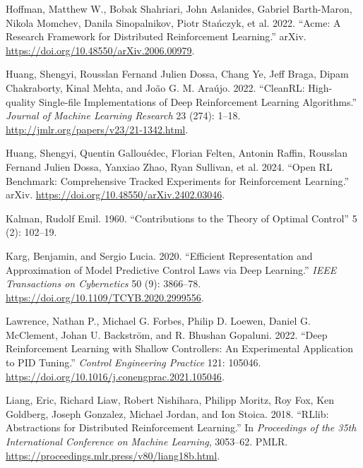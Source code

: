 \documentclass[
  letterpaper,
  DIV=11,
  numbers=noendperiod,
  oneside]{scrartcl}
\newlength{\cslhangindent}
\newenvironment{CSLReferences}[2] %
 {\begin{list}{}{%
  \setlength{\itemindent}{0pt}
  \setlength{\leftmargin}{0pt}
  \setlength{\parsep}{0pt}
  \ifodd #1
   \setlength{\leftmargin}{\cslhangindent}
   \setlength{\itemindent}{-1\cslhangindent}
  \fi
  \setlength{\itemsep}{#2\baselineskip}}}
 {\end{list}}
\begin{document}
\begin{CSLReferences}{1}{0}
Hoffman, Matthew W., Bobak Shahriari, John Aslanides, Gabriel
Barth-Maron, Nikola Momchev, Danila Sinopalnikov, Piotr Stańczyk, et al.
2022. {``Acme: {A Research Framework} for {Distributed Reinforcement
Learning}.''} arXiv. \url{https://doi.org/10.48550/arXiv.2006.00979}.

Huang, Shengyi, Rousslan Fernand Julien Dossa, Chang Ye, Jeff Braga,
Dipam Chakraborty, Kinal Mehta, and João G. M. Araújo. 2022.
{``{CleanRL}: {High-quality Single-file Implementations} of {Deep
Reinforcement Learning Algorithms}.''} \emph{Journal of Machine Learning
Research} 23 (274): 1--18.
\url{http://jmlr.org/papers/v23/21-1342.html}.

Huang, Shengyi, Quentin Gallouédec, Florian Felten, Antonin Raffin,
Rousslan Fernand Julien Dossa, Yanxiao Zhao, Ryan Sullivan, et al. 2024.
{``Open {RL Benchmark}: {Comprehensive Tracked Experiments} for
{Reinforcement Learning}.''} arXiv.
\url{https://doi.org/10.48550/arXiv.2402.03046}.

Kalman, Rudolf Emil. 1960. {``Contributions to the Theory of Optimal
Control''} 5 (2): 102--19.

Karg, Benjamin, and Sergio Lucia. 2020. {``Efficient {Representation}
and {Approximation} of {Model Predictive Control Laws} via {Deep
Learning}.''} \emph{IEEE Transactions on Cybernetics} 50 (9): 3866--78.
\url{https://doi.org/10.1109/TCYB.2020.2999556}.

Lawrence, Nathan P., Michael G. Forbes, Philip D. Loewen, Daniel G.
McClement, Johan U. Backström, and R. Bhushan Gopaluni. 2022. {``Deep
Reinforcement Learning with Shallow Controllers: {An} Experimental
Application to {PID} Tuning.''} \emph{Control Engineering Practice} 121:
105046. \url{https://doi.org/10.1016/j.conengprac.2021.105046}.

Liang, Eric, Richard Liaw, Robert Nishihara, Philipp Moritz, Roy Fox,
Ken Goldberg, Joseph Gonzalez, Michael Jordan, and Ion Stoica. 2018.
{``{RLlib}: {Abstractions} for {Distributed Reinforcement Learning}.''}
In \emph{Proceedings of the 35th {International Conference} on {Machine
Learning}}, 3053--62. PMLR.
\url{https://proceedings.mlr.press/v80/liang18b.html}.


\end{CSLReferences}
\end{document}
